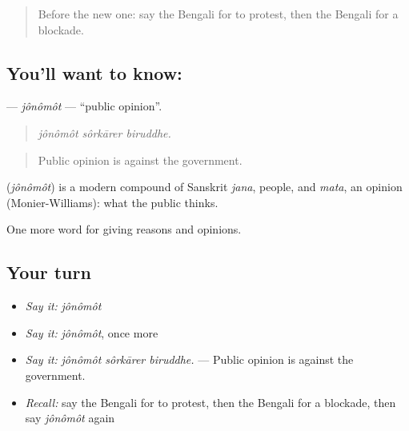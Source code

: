 \label{lesson:BN-C349-jonomot}



\begin{quote}
Before the new one: say the Bengali for to protest, then the Bengali for a blockade.
\end{quote}

\subsection*{You'll want to know: }
\textbf{} — \emph{jônômôt} — \textquotedblleft{}public opinion\textquotedblright{}.

\begin{quote}
  
\end{quote}

\begin{quote}
\emph{jônômôt sôrkārer biruddhe.}
\end{quote}

\begin{quote}
Public opinion is against the government.
\end{quote}

\begin{cousinweb}
\textbf{} (\emph{jônômôt}) is a modern compound of Sanskrit \emph{jana}, people, and \emph{mata}, an opinion (Monier-Williams): what the public thinks.
\end{cousinweb}

\begin{grammarlens}[title={What you've built}]
One more word for giving reasons and opinions.
\end{grammarlens}

\subsection*{Your turn}
\begin{itemize}
\raggedright
  \item \emph{Say it:} \emph{jônômôt}
  \item \emph{Say it:} \emph{jônômôt}, once more
  \item \emph{Say it:} \emph{jônômôt sôrkārer biruddhe.} — Public opinion is against the government.
  \item \emph{Recall:} say the Bengali for to protest, then the Bengali for a blockade, then say \emph{jônômôt} again
\end{itemize}

